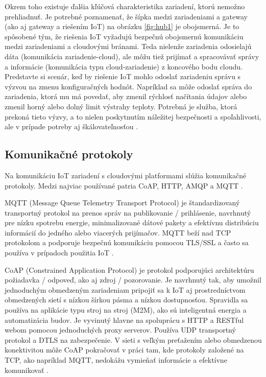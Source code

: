 \documentclass[twoside]{ctuthesis}
\theoremstyle{plain}
\theoremstyle{definition}
\theoremstyle{note}
\begin{document}
Okrem toho existuje ďalšia kľúčová charakteristika zariadení, ktorú nemožno prehliadnuť. Je potrebné poznamenať, že šípka medzi zariadeniami a gateway (ako aj gateway a riešením IoT) na obrázku  \ref{fig:hub1} je obojsmerná. Je to spôsobené tým, že riešenia IoT vyžadujú bezpečnú obojsmernú komunikáciu medzi zariadeniami a cloudovými bránami.
Teda nielenže zariadenia odosielajú dáta (komunikácia zariadenie-cloud), ale môžu tiež prijímať a spracovávať správy a informácie (komunikácia typu cloud-zariadenie) z koncového bodu cloudu. Predstavte si scenár, keď by riešenie IoT mohlo odoslať zariadeniu správu s výzvou na zmenu konfiguračných hodnôt. Napríklad sa môže odoslať správa do zariadenia, ktorá mu má povedať, aby zmenil rýchlosť načítania údajov alebo zmenil horný alebo dolný limit výstrahy teploty. 
Potrebná je služba, ktorá prekoná tieto výzvy, a to nielen poskytnutím náležitej bezpečnosti a spoľahlivosti, ale v prípade potreby aj škálovateľnosťou \cite{azureHub}. 

\subsection{Komunikačné protokoly }
Na komunikáciu IoT zariadení s cloudovými platformami slúžia komunikačné protokoly. Medzi najviac používané patria CoAP, HTTP, AMQP a MQTT \cite{protocols}.
\newline

MQTT (Message Queue Telemetry Transport Protocol) je štandardizovaný transportný protokol na prenos správ na publikovanie / prihlásenie, navrhnutý pre nízku spotrebu energie, minimalizované dátové pakety a efektívnu distribúciu informácií do jedného alebo viacerých prijímačov. MQTT beží nad TCP protokolom a podporuje bezpečnú komunikáciu pomocou TLS/SSL a často sa používa v prípadoch použitia IoT \cite{protocols}.
\newline

CoAP (Constrained Application Protocol) je protokol podporujúci architektúru požiadavka / odpoveď, ako aj zdroj / pozorovanie. Je navrhnutý tak, aby umožnil jednoduchým obmedzeným zariadeniam pripojiť sa k IoT aj prostredníctvom obmedzených sietí s nízkou šírkou pásma a nízkou dostupnosťou. Spravidla sa používa na aplikácie typu stroj na stroj (M2M), ako sú inteligentná energia a automatizácia budov. Je vyvinutý hlavne na spoluprácu s HTTP a RESTful webom pomocou jednoduchých proxy serverov. Používa UDP transportný protokol a DTLS na zabezpečenie. V sieti s veľkým preťažením alebo obmedzenou konektivitou môže CoAP pokračovať v práci tam, kde protokoly založené na TCP, ako napríklad MQTT, nedokážu vymieňať informácie a efektívne komunikovať \cite{coap}.
\newline
\end{document}
